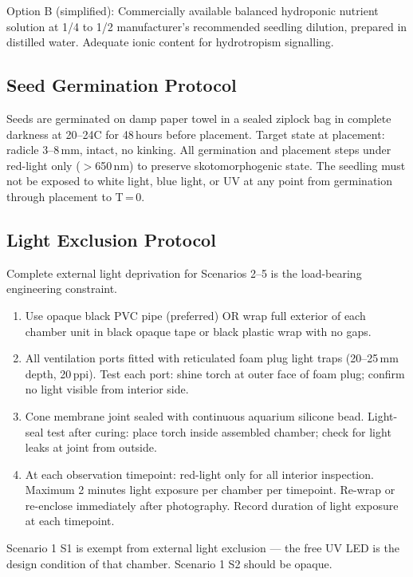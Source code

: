 \documentclass[10pt, a4paper]{article}
\begin{document}
Option B (simplified):
Commercially available balanced hydroponic nutrient
solution at 1/4 to 1/2 manufacturer's recommended
seedling dilution, prepared in distilled water.
Adequate ionic content for hydrotropism signalling.

\subsection{Seed Germination Protocol}

Seeds are germinated on damp paper towel in a sealed
ziplock bag in complete darkness at 20--24\textdegree C
for 48\,hours before placement.
Target state at placement: radicle 3--8\,mm, intact,
no kinking.
All germination and placement steps under red-light only
($>$650\,nm) to preserve skotomorphogenic state.
The seedling must not be exposed to white light,
blue light, or UV at any point from germination
through placement to T\,=\,0.

\subsection{Light Exclusion Protocol}

Complete external light deprivation for Scenarios 2--5
is the load-bearing engineering constraint.

\begin{enumerate}[itemsep=0.2em]
  \item Use opaque black PVC pipe (preferred) OR wrap
    full exterior of each chamber unit in black opaque
    tape or black plastic wrap with no gaps.
  \item All ventilation ports fitted with reticulated
    foam plug light traps (20--25\,mm depth, 20\,ppi).
    Test each port: shine torch at outer face of foam
    plug; confirm no light visible from interior side.
  \item Cone membrane joint sealed with continuous
    aquarium silicone bead. Light-seal test after curing:
    place torch inside assembled chamber; check for light
    leaks at joint from outside.
  \item At each observation timepoint: red-light only
    for all interior inspection. Maximum 2 minutes
    light exposure per chamber per timepoint.
    Re-wrap or re-enclose immediately after photography.
    Record duration of light exposure at each timepoint.
\end{enumerate}

Scenario 1 S1 is exempt from external light exclusion
--- the free UV LED is the design condition of that
chamber. Scenario 1 S2 should be opaque.
\end{document}
